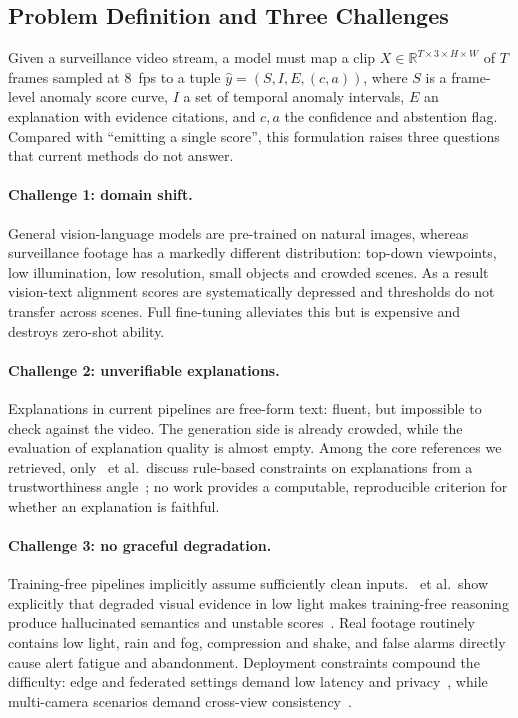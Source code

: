 \subsection{Problem Definition and Three Challenges}

Given a surveillance video stream, a model must map a clip $X \in \mathbb{R}^{T \times 3 \times H \times W}$ of $T$ frames sampled at $8$~fps to a tuple $\hat{y} = (S, I, E, (c, a))$, where $S$ is a frame-level anomaly score curve, $I$ a set of temporal anomaly intervals, $E$ an explanation with evidence citations, and $c, a$ the confidence and abstention flag. Compared with ``emitting a single score'', this formulation raises three questions that current methods do not answer.

\paragraph{Challenge 1: domain shift.} General vision-language models are pre-trained on natural images, whereas surveillance footage has a markedly different distribution: top-down viewpoints, low illumination, low resolution, small objects and crowded scenes. As a result vision-text alignment scores are systematically depressed and thresholds do not transfer across scenes. Full fine-tuning alleviates this but is expensive and destroys zero-shot ability.

\paragraph{Challenge 2: unverifiable explanations.} Explanations in current pipelines are free-form text: fluent, but impossible to check against the video. The generation side is already crowded, while the evaluation of explanation quality is almost empty. Among the core references we retrieved, only \citeauthor{khedher2025trustworthy}~et al.\ discuss rule-based constraints on explanations from a trustworthiness angle~\cite{khedher2025trustworthy}; no work provides a computable, reproducible criterion for whether an explanation is faithful.

\paragraph{Challenge 3: no graceful degradation.} Training-free pipelines implicitly assume sufficiently clean inputs. \citeauthor{mo2026lowlight}~et al.\ show explicitly that degraded visual evidence in low light makes training-free reasoning produce hallucinated semantics and unstable scores~\cite{mo2026lowlight}. Real footage routinely contains low light, rain and fog, compression and shake, and false alarms directly cause alert fatigue and abandonment. Deployment constraints compound the difficulty: edge and federated settings demand low latency and privacy~\cite{yun2025edgegnn,li2026federated,wang2025holotrace}, while multi-camera scenarios demand cross-view consistency~\cite{mishra2026dementia}.

